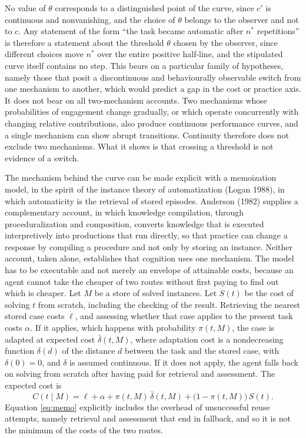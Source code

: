 \documentclass[11pt]{article}
\theoremstyle{definition}
\begin{document}
No value of $\theta$ corresponds to a distinguished point of the curve, since $c'$ is continuous and nonvanishing, and the choice of $\theta$ belongs to the observer and not to $c$. Any statement of the form ``the task became automatic after $n^*$ repetitions'' is therefore a statement about the threshold $\theta$ chosen by the observer, since different choices move $n^*$ over the entire positive half-line, and the stipulated curve itself contains no step. This bears on a particular family of hypotheses, namely those that posit a discontinuous and behaviourally observable switch from one mechanism to another, which would predict a gap in the cost or practice axis. It does not bear on all two-mechanism accounts. Two mechanisms whose probabilities of engagement change gradually, or which operate concurrently with changing relative contributions, also produce continuous performance curves, and a single mechanism can show abrupt transitions. Continuity therefore does not exclude two mechanisms. What it shows is that crossing a threshold is not evidence of a switch.

The mechanism behind the curve can be made explicit with a memoization model, in the spirit of the instance theory of automatization (Logan 1988), in which automaticity is the retrieval of stored episodes. Anderson (1982) supplies a complementary account, in which knowledge compilation, through proceduralization and composition, converts knowledge that is executed interpretively into productions that run directly, so that practice can change a response by compiling a procedure and not only by storing an instance. Neither account, taken alone, establishes that cognition uses one mechanism. The model has to be executable and not merely an envelope of attainable costs, because an agent cannot take the cheaper of two routes without first paying to find out which is cheaper. Let $M$ be a store of solved instances. Let $S(t)$ be the cost of solving $t$ from scratch, including the checking of the result. Retrieving the nearest stored case costs $\ell$, and assessing whether that case applies to the present task costs $\alpha$. If it applies, which happens with probability $\pi(t,M)$, the case is adapted at expected cost $\bar\delta(t,M)$, where adaptation cost is a nondecreasing function $\delta(d)$ of the distance $d$ between the task and the stored case, with $\delta(0)=0$, and $\delta$ is assumed continuous. If it does not apply, the agent falls back on solving from scratch after having paid for retrieval and assessment. The expected cost is
\begin{equation}
C(t\mid M)=\ell+\alpha+\pi(t,M)\,\bar\delta(t,M)+\bigl(1-\pi(t,M)\bigr)\,S(t).\label{eq:memo}
\end{equation}
Equation \eqref{eq:memo} explicitly includes the overhead of unsuccessful reuse attempts, namely retrieval and assessment that end in fallback, and so it is not the minimum of the costs of the two routes.
\end{document}
